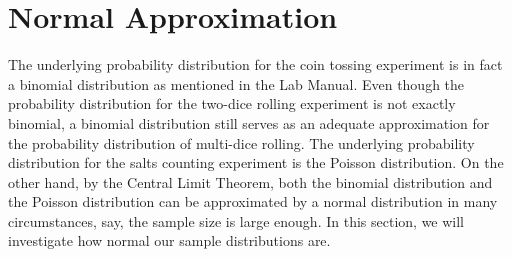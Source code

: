 \documentclass[11pt]{book}
\theoremstyle{break}
\theoremstyle{break}
\begin{document}
\newpage
\section{Normal Approximation}
The underlying probability distribution for the coin tossing experiment is in fact a binomial distribution as mentioned in the Lab Manual. Even though the probability distribution for the two-dice rolling experiment is not exactly binomial, a binomial distribution still serves as an adequate approximation for the probability distribution of multi-dice rolling. The underlying probability distribution for the salts counting experiment is the Poisson distribution. On the other hand, by the Central Limit Theorem, both the binomial distribution and the Poisson distribution can be approximated by a normal distribution in many circumstances, say, the sample size is large enough. In this section, we will investigate how normal our sample distributions are.\\
\end{document}
